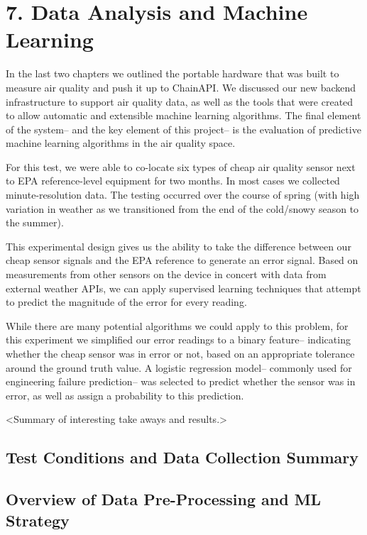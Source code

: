 \chapter{7. Data Analysis and Machine Learning}

In the last two chapters we outlined the portable hardware that was built to measure air quality and push it up to ChainAPI.  We discussed our new backend infrastructure to support air quality data, as well as the tools that were created to allow automatic and extensible machine learning algorithms.  The final element of the system-- and the key element of this project-- is the evaluation of predictive machine learning algorithms in the air quality space.
 
For this test, we were able to co-locate six types of cheap air quality sensor next to EPA reference-level equipment for two months.  In most cases we collected minute-resolution data.  The testing occurred over the course of spring (with high variation in weather as we transitioned from the end of the cold/snowy season to the summer).   

This experimental design gives us the ability to take the difference between our cheap sensor signals and the EPA reference to generate an error signal.  Based on measurements from other sensors on the device in concert with data from external weather APIs, we can apply supervised learning techniques that attempt to predict the magnitude of the error for every reading.  

While there are many potential algorithms we could apply to this problem, for this experiment we simplified our error readings to a binary feature-- indicating whether the cheap sensor was in error or not, based on an appropriate tolerance around the ground truth value.  A logistic regression model-- commonly used for engineering failure prediction-- was selected to predict whether the sensor was in error, as well as assign a probability to this prediction.

<Summary of interesting take aways and results.>

\section{Test Conditions and Data Collection Summary}
 
\FloatBarrier

\section{Overview of Data Pre-Processing and ML Strategy}

\FloatBarrier

